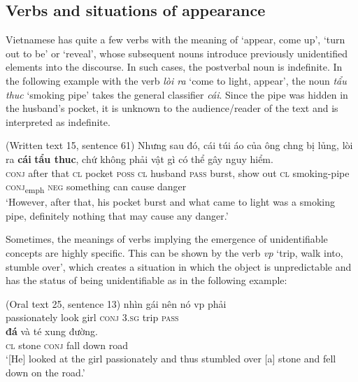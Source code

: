\documentclass[output=paper]{langsci/langscibook}
\begin{document}
\subsection{Verbs and situations of appearance}\label{1sec:43}
Vietnamese has quite a few verbs with the meaning of `appear, come up', `turn out to be' or `reveal', whose subsequent nouns introduce previously unidentified elements into the discourse. In such cases, the postverbal noun is indefinite. In the following example with the verb {\emph{lòi ra}} `come to light, appear', the noun {\emph{tẩu thu{\dao}c}} `smoking pipe' takes the general classifier {\emph{cái}}. Since the pipe was hidden in the husband's pocket, it is unknown to the audience/reader of the text and is interpreted as indefinite.

\begin{exe}
\ex\label{1ex:34}
(Written text 15, sentence 61)
\exi{}
\gll Nhưng sau  đó,   cái {túi áo}  của     ông ch{\daob}ng    bị       lủng,  lòi      ra  {\textbf{cái}} {\textbf{tẩu thu{\dao}c}},      chứ            {không phải}  {vật gì}          {có thể}  gây     {nguy hiểm}.\\
{\textsc{conj}}   after that  {\textsc{cl}} pocket  {\textsc{poss}}  {\textsc{cl}} husband   {\textsc{pass}}  burst,  show   out  {\textsc{cl}} smoking-pipe {\textsc{conj}}\textsubscript{emph}  {\textsc{neg}}            something  can      cause  danger \\
\glt `However, after that, his pocket burst and what came to light was a smoking pipe, definitely nothing that may cause any danger.'
\end{exe}

Sometimes, the meanings of verbs implying the emergence of unidentifiable concepts are highly specific. This can be shown by the verb {\emph{v{\daa}p}} `trip, walk into, stumble over', which creates a situation in which the object is unpredictable and has the status of being unidentifiable as in the following example:

\begin{samepage}
\begin{exe}
\ex\label{1ex:35}
(Oral text 25, sentence 13)
\exi{}
         nhìn gái nên      nó     v{\daa}p   phải     \\
passionately look girl {\textsc{conj}} 3.{\textsc{sg}}  trip  {\textsc{pass}}  \\
\glt
\exi{}
 {\textbf{đá}}      và        té   xu{\dao}ng  đường. \\
{\textsc{cl}}  stone  {\textsc{conj}} fall  down  road \\
\glt `[He] looked at the girl passionately and thus stumbled over [a] stone and fell down on the road.'
\end{exe}
\end{samepage}
\end{document}
